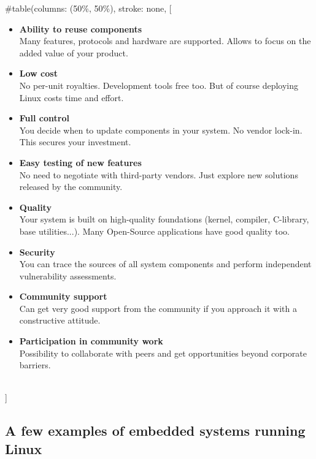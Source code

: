 #table(columns: (50\%, 50\%), stroke: none,
[
     \begin{itemize}
     \item {\bf Ability to reuse components}\\
           Many features, protocols and hardware are supported.
           Allows to focus on the added value of your product.
     \item {\bf Low cost}\\
           No per-unit royalties. Development tools free
	   too. But of course deploying Linux costs time and effort.
     \item {\bf Full control}\\
           You decide when to update components in your
	   system. No vendor lock-in. This secures your investment.
     \item {\bf Easy testing of new features}\\
           No need to negotiate with third-party vendors. Just explore
	   new solutions released by the community.
     \end{itemize}
     \begin{itemize}
     \item {\bf Quality}\\
           Your system is built on high-quality foundations
           (kernel, compiler, C-library, base utilities...). Many
           Open-Source applications have good quality too.
     \item {\bf Security}\\
           You can trace the sources of all system components
           and perform independent vulnerability assessments.
     \item {\bf Community support}\\
           Can get very good support from the
	   community if you approach it with a constructive attitude.
     \item {\bf Participation in community work}\\
	   Possibility to collaborate with peers and get opportunities
           beyond corporate barriers.
     \end{itemize}
  \\]


\subsection[Systems running Linux]{A few examples of embedded systems
  running Linux}


